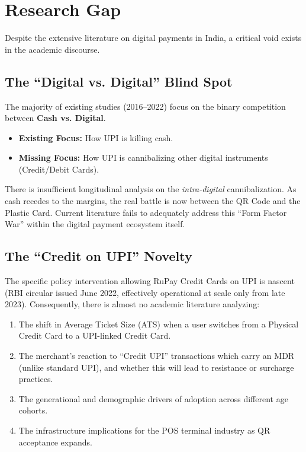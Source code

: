 \chapter{Research Gap}

Despite the extensive literature on digital payments in India, a critical void exists in the academic discourse.

\section{The ``Digital vs. Digital'' Blind Spot}

The majority of existing studies (2016--2022) focus on the binary competition between \textbf{Cash vs. Digital}.

\begin{itemize}
    \item \textbf{Existing Focus:} How UPI is killing cash.
    \item \textbf{Missing Focus:} How UPI is cannibalizing other digital instruments (Credit/Debit Cards).
\end{itemize}

There is insufficient longitudinal analysis on the \textit{intra-digital} cannibalization. As cash recedes to the margins, the real battle is now between the QR Code and the Plastic Card. Current literature fails to adequately address this ``Form Factor War'' within the digital payment ecosystem itself.

\section{The ``Credit on UPI'' Novelty}

The specific policy intervention allowing RuPay Credit Cards on UPI is nascent (RBI circular issued June 2022, effectively operational at scale only from late 2023). Consequently, there is almost no academic literature analyzing:

\begin{enumerate}
    \item The shift in Average Ticket Size (ATS) when a user switches from a Physical Credit Card to a UPI-linked Credit Card.
    \item The merchant's reaction to ``Credit UPI'' transactions which carry an MDR (unlike standard UPI), and whether this will lead to resistance or surcharge practices.
    \item The generational and demographic drivers of adoption across different age cohorts.
    \item The infrastructure implications for the POS terminal industry as QR acceptance expands.
\end{enumerate}

